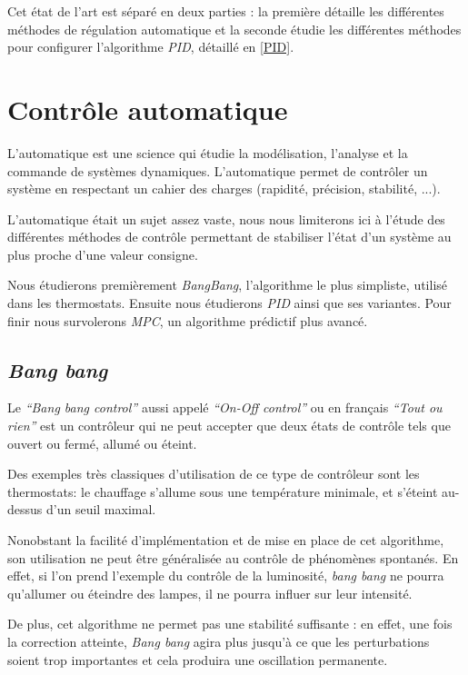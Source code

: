 \documentclass[a4paper,10pt]{report}
\begin{document}
Cet état de l'art est séparé en deux parties : la première détaille les différentes méthodes de régulation automatique et la seconde étudie les différentes méthodes pour configurer l'algorithme \emph{PID}, détaillé en \ref{PID}.

\section{Contrôle automatique}
L’automatique est une science qui étudie la modélisation, l’analyse et la commande de systèmes dynamiques.
L’automatique permet de contrôler un système en respectant un cahier des charges (rapidité, précision, stabilité, ...).

L'automatique était un sujet assez vaste, nous nous limiterons ici à l'étude des différentes méthodes de contrôle permettant de stabiliser l'état d'un système au plus proche d'une valeur consigne.

Nous étudierons premièrement \emph{BangBang}, l'algorithme le plus simpliste, utilisé dans les thermostats.
Ensuite nous étudierons \emph{PID} ainsi que ses variantes.
Pour finir nous survolerons \emph{MPC}, un algorithme prédictif plus avancé.

\subsection{\emph{Bang bang}}
Le \emph{``Bang bang control''} aussi appelé \emph{``On-Off control''} ou en français \emph{``Tout ou rien''} est un contrôleur qui ne peut accepter que deux états de contrôle tels que ouvert ou fermé, allumé ou éteint.

Des exemples très classiques d'utilisation de ce type de contrôleur sont les thermostats: le chauffage s'allume sous une température minimale, et s'éteint au-dessus d'un seuil maximal.

Nonobstant la facilité d'implémentation et de mise en place de cet algorithme, son utilisation ne peut être généralisée au contrôle de phénomènes spontanés. En effet, si l'on prend l'exemple du contrôle de la luminosité, \emph{bang bang} ne pourra qu'allumer ou éteindre des lampes, il ne pourra influer sur leur intensité. \cite{Burghes2004}

De plus, cet algorithme ne permet pas une stabilité suffisante : en effet, une fois la correction atteinte, \emph{Bang bang} agira plus jusqu'à ce que les perturbations soient trop importantes et cela produira une oscillation permanente. \cite{ballard1993pid}
\end{document}
